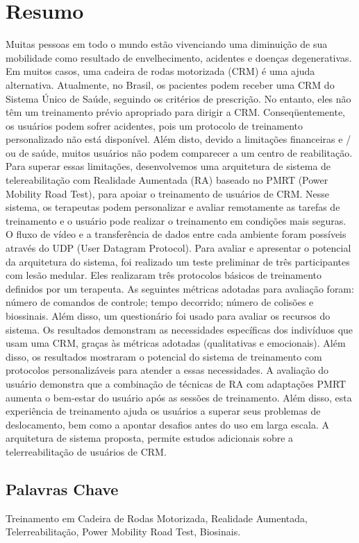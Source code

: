 \newpage
\thispagestyle{empty}
\chapter*{Resumo}
\vspace{-35pt}
Muitas pessoas em todo o mundo estão vivenciando uma diminuição de sua mobilidade como resultado de envelhecimento, acidentes e doenças degenerativas. Em muitos casos, uma cadeira de rodas motorizada (CRM) é uma ajuda alternativa. Atualmente, no Brasil, os pacientes podem receber uma CRM do Sistema Único de Saúde, seguindo os critérios de prescrição. No entanto, eles não têm um treinamento prévio apropriado para dirigir a CRM. Conseqüentemente, os usuários podem sofrer acidentes, pois um protocolo de treinamento personalizado não está disponível. Além disto, devido a limitações financeiras e / ou de saúde, muitos usuários não podem comparecer a um centro de reabilitação. Para superar essas limitações, desenvolvemos uma arquitetura de sistema de telereabilitação com Realidade Aumentada (RA) baseado no PMRT (Power Mobility Road Test), para apoiar o treinamento de usuários de CRM. Nesse sistema, os terapeutas podem personalizar e avaliar remotamente as tarefas de treinamento e o usuário pode realizar o treinamento em condições mais seguras. O fluxo de vídeo e a transferência de dados entre cada ambiente foram possíveis através do UDP (User Datagram Protocol). Para avaliar e apresentar o potencial da arquitetura do sistema, foi realizado um teste preliminar de três participantes com lesão medular. Eles realizaram três protocolos básicos de treinamento definidos por um terapeuta. As seguintes métricas adotadas para avaliação foram: número de comandos de controle; tempo decorrido; número de colisões e biossinais. Além disso, um questionário foi usado para avaliar os recursos do sistema. Os resultados demonstram as necessidades específicas dos indivíduos que usam uma CRM, graças às métricas adotadas (qualitativas e emocionais). Além disso, os resultados mostraram o potencial do sistema de treinamento com protocolos personalizáveis para atender a essas necessidades. A avaliação do usuário demonstra que a combinação de técnicas de RA com adaptações PMRT aumenta o bem-estar do usuário após as sessões de treinamento. Além disso, esta experiência de treinamento ajuda os usuários a superar seus problemas de deslocamento, bem como a apontar desafios antes do uso em larga escala. A arquitetura de sistema proposta, permite estudos adicionais sobre a telerreabilitação de usuários de CRM.
\section*{Palavras Chave}
 Treinamento em Cadeira de Rodas Motorizada, Realidade Aumentada, Telerreabilitação, Power Mobility Road Test, Biosinais.
\newpage

